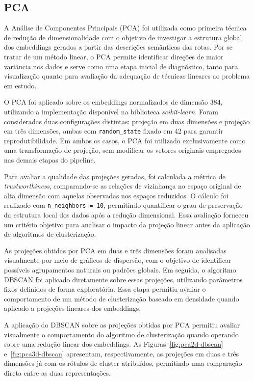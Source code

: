 \documentclass[12pt,a4paper]{article}
\begin{document}
\subsection{PCA}

A Análise de Componentes Principais (PCA) foi utilizada como primeira técnica de redução de dimensionalidade com o objetivo de investigar a estrutura global dos embeddings gerados a partir das descrições semânticas das rotas. Por se tratar de um método linear, o PCA permite identificar direções de maior variância nos dados e serve como uma etapa inicial de diagnóstico, tanto para visualização quanto para avaliação da adequação de técnicas lineares ao problema em estudo.

O PCA foi aplicado sobre os embeddings normalizados de dimensão 384, utilizando a implementação disponível na biblioteca \textit{scikit-learn}. Foram consideradas duas configurações distintas: projeção em duas dimensões e projeção em três dimensões, ambas com \texttt{random\_state} fixado em 42 para garantir reprodutibilidade. Em ambos os casos, o PCA foi utilizado exclusivamente como uma transformação de projeção, sem modificar os vetores originais empregados nas demais etapas do pipeline.

Para avaliar a qualidade das projeções geradas, foi calculada a métrica de \textit{trustworthiness}, comparando-se as relações de vizinhança no espaço original de alta dimensão com aquelas observadas nos espaços reduzidos. O cálculo foi realizado com \texttt{n\_neighbors = 10}, permitindo quantificar o grau de preservação da estrutura local dos dados após a redução dimensional. Essa avaliação forneceu um critério objetivo para analisar o impacto da projeção linear antes da aplicação de algoritmos de clusterização.

As projeções obtidas por PCA em duas e três dimensões foram analisadas visualmente por meio de gráficos de dispersão, com o objetivo de identificar possíveis agrupamentos naturais ou padrões globais. Em seguida, o algoritmo DBSCAN foi aplicado diretamente sobre essas projeções, utilizando parâmetros fixos definidos de forma exploratória. Essa etapa permitiu avaliar o comportamento de um método de clusterização baseado em densidade quando aplicado a projeções lineares dos embeddings.

A aplicação do DBSCAN sobre as projeções obtidas por PCA permitiu avaliar visualmente o
comportamento do algoritmo de clusterização quando operando sobre uma redução linear dos
embeddings. As Figuras~\ref{fig:pca2d-dbscan} e~\ref{fig:pca3d-dbscan} apresentam,
respectivamente, as projeções em duas e três dimensões já com os rótulos de cluster
atribuídos, permitindo uma comparação direta entre as duas representações.
\end{document}
